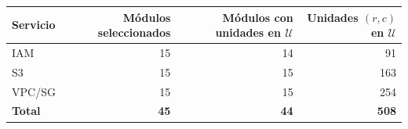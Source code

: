 \begin{tabular}{lrrr}
\toprule
Servicio & Módulos seleccionados & Módulos con unidades en $\mathcal{U}$ & Unidades $(r, c)$ en $\mathcal{U}$ \\
\midrule
IAM & 15 & 14 & 91 \\
S3 & 15 & 15 & 163 \\
VPC/SG & 15 & 15 & 254 \\
\midrule
\textbf{Total} & \textbf{45} & \textbf{44} & \textbf{508} \\
\bottomrule
\end{tabular}
